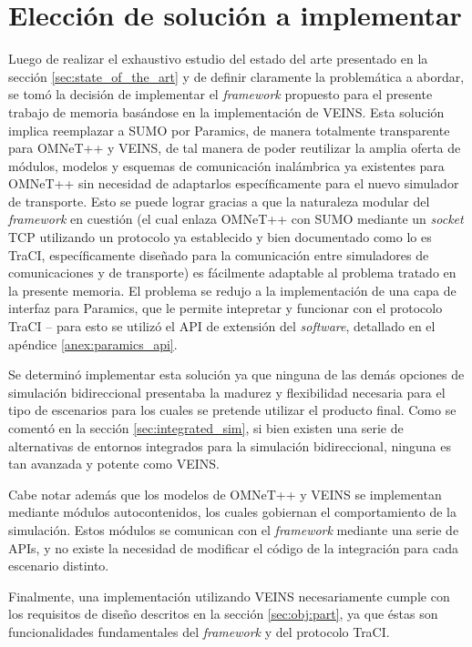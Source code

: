 \section{Elección de solución a implementar}\label{sec:solution}

Luego de realizar el exhaustivo estudio del estado del arte presentado en la sección \ref{sec:state_of_the_art} y de definir claramente la problemática a abordar, se tomó la decisión de implementar el \emph{framework} propuesto para el presente trabajo de memoria basándose en la implementación de VEINS. Esta solución implica reemplazar a SUMO por Paramics, de manera totalmente transparente para OMNeT++ y VEINS, de tal manera de poder reutilizar la amplia oferta de módulos, modelos y esquemas de comunicación inalámbrica ya existentes para OMNeT++ sin necesidad de adaptarlos específicamente para el nuevo simulador de transporte. 
Esto se puede lograr gracias a que la naturaleza modular del \emph{framework} en cuestión (el cual enlaza OMNeT++ con SUMO mediante un \emph{socket} TCP utilizando un protocolo ya establecido y bien documentado como lo es TraCI, específicamente diseñado para la comunicación entre simuladores de comunicaciones y de transporte) es fácilmente adaptable al problema tratado en la presente memoria. 
El problema se redujo a la implementación de una capa de interfaz para Paramics, que le permite intepretar y funcionar con el protocolo TraCI -- para esto se utilizó el API de extensión del \emph{software}, detallado en el apéndice \ref{anex:paramics_api}. 

Se determinó implementar esta solución ya que ninguna de las demás opciones de simulación bidireccional presentaba la madurez y flexibilidad necesaria para el tipo de escenarios para los cuales se pretende utilizar el producto final. Como se comentó en la sección \ref{sec:integrated_sim}, si bien existen una serie de alternativas de entornos integrados para la simulación bidireccional, ninguna es tan avanzada y potente como VEINS.

Cabe notar además que los modelos de OMNeT++ y VEINS se implementan mediante módulos autocontenidos, los cuales gobiernan el comportamiento de la simulación. Estos módulos se comunican con el \emph{framework} mediante una serie de APIs, y no existe la necesidad de modificar el código de la integración para cada escenario distinto.

Finalmente, una implementación utilizando VEINS necesariamente cumple con los requisitos de diseño descritos en la sección \ref{sec:obj:part}, ya que éstas son funcionalidades fundamentales del \emph{framework} y del protocolo TraCI.